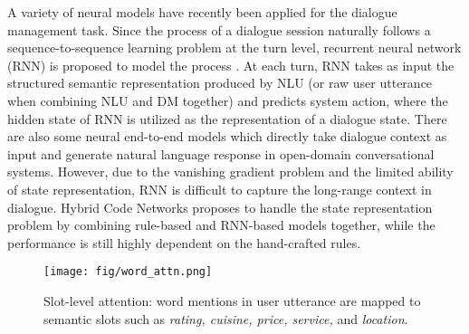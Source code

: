 A variety of neural models have recently been applied for the dialogue management task. Since the process of a dialogue session naturally follows a sequence-to-sequence learning problem at the turn level, recurrent neural network (RNN) is proposed to model the process \cite{henderson2014word, mrkvsic2016neural, wen2017latent}. At each turn, RNN takes as input the structured semantic representation produced by NLU (or raw user utterance when combining NLU and DM together) and predicts system action, where the hidden state of RNN is utilized as the representation of a dialogue state. 
There are also some neural end-to-end models which directly take dialogue context as input and generate natural language response \cite{shang2015neural, li2016deep, serban2016building, serban2017hierarchical} in open-domain conversational systems.
However, due to the vanishing gradient problem and the limited ability of state representation, RNN is difficult to capture the long-range context in dialogue. Hybrid Code Networks \cite{williams2017hybrid} proposes to handle the state representation problem by combining rule-based and RNN-based models together, while the performance is still highly dependent on the hand-crafted rules.





\begin{figure}
  \texttt{[image: fig/word\_attn.png]}
  \caption{Slot-level attention: word mentions in user utterance are mapped to semantic slots such as {\it rating, cuisine, price, service,} and {\it location}.
  }%
  \label{fig:word_attn}
\end{figure}


